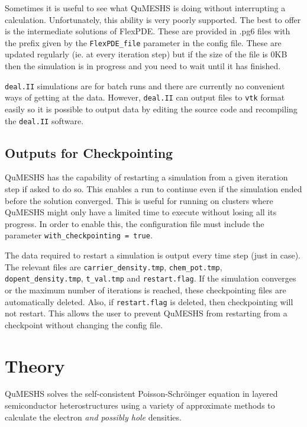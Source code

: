 \documentclass[12pt]{article}
\newcommand{\red}[1]{{\color{red} \it #1}}
\begin{document}
Sometimes it is useful to see what QuMESHS is doing without interrupting a calculation.
Unfortunately, this ability is very poorly supported.  The best to offer is the intermediate
solutions of FlexPDE.  These are provided in .pg6 files with the prefix given by the
\texttt{FlexPDE\_file} parameter in the config file.  These are updated regularly (ie.
at every iteration step) but if the size of the file is 0KB then the simulation is in
progress and you need to wait until it has finished.

\texttt{deal.II} simulations are for batch runs and there are currently no convenient ways
of getting at the data.  However, \texttt{deal.II} can output files to \texttt{vtk} format
easily so it is possible to output data by editing the source code and recompiling the
\texttt{deal.II} software.


\subsection{Outputs for Checkpointing}
\label{subsec:CheckpointOutput}

QuMESHS has the capability of restarting a simulation from a given iteration step if asked
to do so.  This enables a run to continue even if the simulation ended before the solution
converged.  This is useful for running on clusters where QuMESHS might only have a limited
time to execute without losing all its progress.  In order to enable this, the configuration
file must include the parameter \texttt{with\_checkpointing = true}.

The data required to restart a simulation is output every time step (just in case).  The
relevant files are \texttt{carrier\_density.tmp}, \texttt{chem\_pot.tmp}, \texttt{dopent\_density.tmp},
\texttt{t\_val.tmp} and \texttt{restart.flag}.  If the simulation converges or the maximum
number of iterations is reached, these checkpointing files are automatically deleted.  Also,
if \texttt{restart.flag} is deleted, then checkpointing will not restart.  This allows the
user to prevent QuMESHS from restarting from a checkpoint without changing the config file.


\section{Theory}

QuMESHS solves the self-consistent Poisson-Schr\"{o}inger equation in layered semiconductor
heterostructures using a variety of approximate methods to calculate the electron \red{and
possibly hole} densities.
\end{document}

